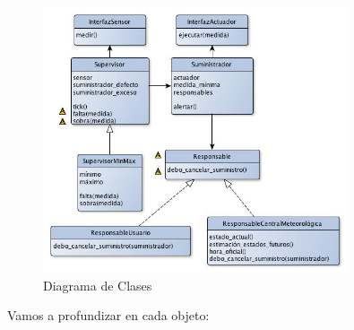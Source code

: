 \begin{figure}[h!]
  \centering
  \includegraphics[width=0.8\textwidth]{./imagenes/clases2.jpg}
  \caption{Diagrama de Clases}
  \label{fig:sec_sum1}
\end{figure}


\newpage Vamos a profundizar en cada objeto:


